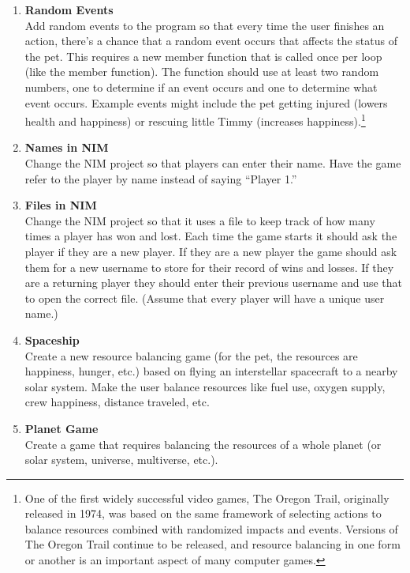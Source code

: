 \begin{enumerate}
\item {\bf Random Events }\\ Add random events to the program so that every time the user finishes an action, there's a chance that a random event occurs that affects the status of the pet.  This requires a new member function that is called once per loop (like the  member function).  The function should use at least two random numbers, one to determine if an event occurs and one to determine what event occurs. Example events might include the pet getting injured (lowers health and happiness) or rescuing little Timmy (increases happiness).\footnote{One of the first widely successful video games, The Oregon Trail\texttrademark, originally released in 1974, was based on the same framework of selecting actions to balance resources combined with randomized impacts and events.  Versions of The Oregon Trail continue to be released, and resource balancing in one form or another is an important aspect of many computer games.}

\item {\bf Names in NIM}\\
Change the NIM project so that players can enter their name.  Have the game refer to the player by name instead of saying ``Player 1.''

\item {\bf Files in NIM}\\
Change the NIM project so that it uses a file to keep track of how many times a player has won and lost.  Each time the game starts it should ask the player if they are a new player.  If they are a new player the game should ask them for a new username to store for their record of wins and losses.  If they are a returning player they should enter their previous username and use that to open the correct file.  (Assume that every player will have a unique user name.)  

\item {\bf Spaceship}\\ 
Create a new resource balancing game (for the pet, the resources are happiness, hunger, etc.)  based on flying an interstellar spacecraft to a nearby solar system.  Make the user balance resources like fuel use, oxygen supply, crew happiness, distance traveled, etc.

\item {\bf Planet Game}\\ Create a game that requires balancing the resources of a whole planet (or solar system, universe, multiverse, etc.).


\end{enumerate}
